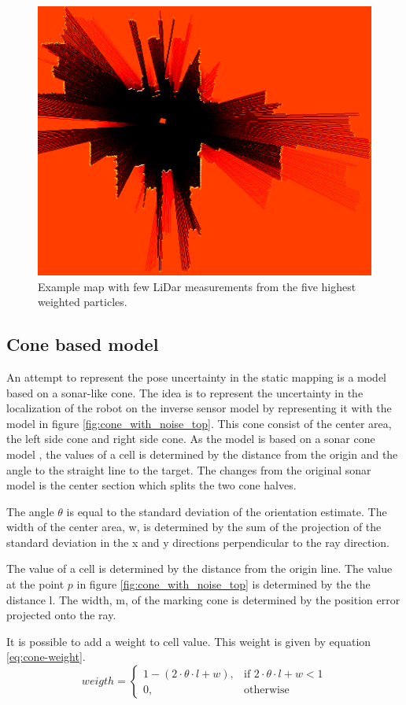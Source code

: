\begin{figure}
	\centering
	\includegraphics[width=0.7\linewidth]{figures/static_mapping/particle_sensor}
	\caption{Example map with few LiDar measurements from the five highest weighted particles.}
	\label{fig:particle_sensor}
\end{figure}

\subsection{Cone based model}
An attempt to represent the pose uncertainty in the static mapping is a model based on a sonar-like cone. 
The idea is to represent the uncertainty in the localization of the robot on the inverse sensor model by representing it with the model in figure \ref{fig:cone_with_noise_top}.  
This cone consist of the center area, the left side cone and right side cone. 
As the model is based on a sonar cone model \cite{probRob}, the values of a cell is determined by the distance from the origin and the angle to the straight line to the target. The changes from the original sonar model is the center section which splits the two cone halves. 

The angle \(\theta\) is equal to the standard deviation of the orientation estimate. 
The width of the center area, w, is determined by the sum of the projection of the standard deviation in the x and y directions perpendicular to the ray direction. 

The value of a cell is determined by the distance from the origin line. 
The value at the point $p$ in figure \ref{fig:cone_with_noise_top} is determined by the the distance l.
The width, m, of the marking cone is determined by the position error projected onto the ray.

It is possible to add a weight to cell value. This weight is given by equation \ref{eq:cone-weight}.
\begin{equation}
\label{eq:cone-weight}
weigth = 
\begin{cases}
1 - ( 2 \cdot \theta \cdot l + w), & \text{if } 2 \cdot \theta \cdot l + w < 1\\
0, & \text{otherwise}
\end{cases}
\end{equation}

